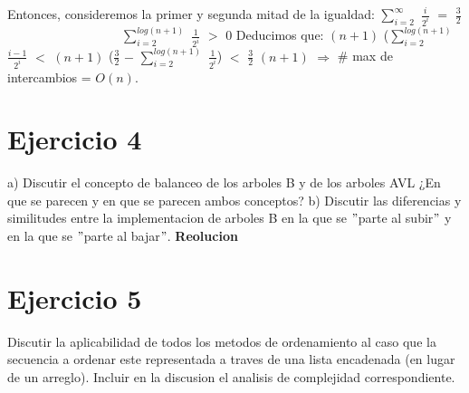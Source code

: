 \documentclass[10pt,a4paper]{article}
\begin{document}
\newline
\newline
\newline
Entonces, consideremos la primer y segunda mitad de la igualdad:
\newline
\newline
$\displaystyle \sum_{i=2}^{\infty}$ $\displaystyle \frac{i}{2^{i}}$ $=$ $\displaystyle \frac{3}{2}$~~~~~~~~~~~~~~~~~~$\displaystyle \sum_{i=2}^{log(n+1)}$ $\displaystyle \frac{1}{2^{i}}$ $>$ $0$
\newline
\newline
\newline
Deducimos que:
\newline
\newline
$(n+1)$ ($\displaystyle \sum_{i=2}^{log(n+1)}$ $\displaystyle \frac{i-1}{2^{i}}$ $<$ $(n+1)$ ($\displaystyle \frac{3}{2}$ $-$ $\displaystyle \sum_{i=2}^{log(n+1)}$ $\displaystyle \frac{1}{2^{i}}$) $<$ $\displaystyle \frac{3}{2}$ $(n+1)$ $\Rightarrow$ \# max de intercambios = $O(n)$.
\newpage

\section{Ejercicio 4}

a) Discutir el concepto de balanceo de los arboles B y de los arboles AVL ¿En que se parecen y en que se parecen ambos conceptos?
\newline
\newline
b) Discutir las diferencias y similitudes entre la implementacion de arboles B en la que se $"$parte al subir$"$ y en la que se $"$parte al bajar$"$.
\newline
\newline
\textbf{Reolucion}
\newpage

\section{Ejercicio 5}

Discutir la aplicabilidad de todos los metodos de ordenamiento al caso que la secuencia a ordenar este representada a traves de una lista encadenada (en lugar de un arreglo). Incluir en la discusion el analisis de complejidad correspondiente. 
\newline
\newline
\end{document}
